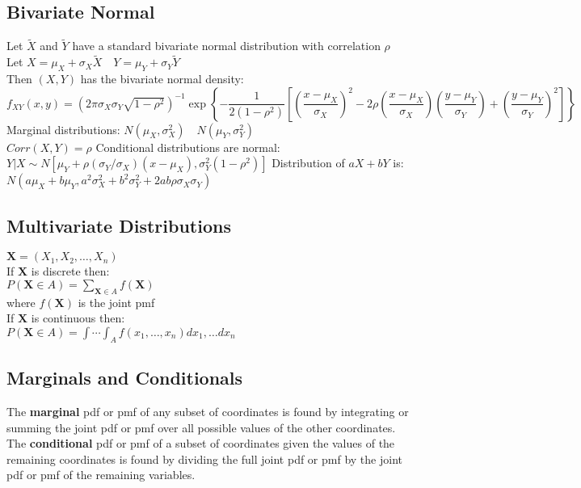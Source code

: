 \documentclass{article}
\begin{document}
\begin{flushleft}
\subsection*{Bivariate Normal}
Let $\tilde{X}$ and $\tilde{Y}$ have a standard bivariate normal distribution with correlation $\rho$\\
Let $X=\mu_X+\sigma_X\tilde{X} \quad Y=\mu_Y+\sigma_Y\tilde{Y}$\\
Then $(X,Y)$ has the bivariate normal density:\\
$f_{XY}(x,y)=\left(2\pi \sigma_X \sigma_Y \sqrt{1-\rho^2} \right)^{-1}\exp{\left\{-\dfrac{1}{2(1-\rho^2)}\left[\left(\dfrac{x-\mu_X}{\sigma_X} \right)^2- 2\rho \left(\dfrac{x-\mu_X}{\sigma_X} \right)\left(\dfrac{y-\mu_Y}{\sigma_Y} \right)+\left(\dfrac{y-\mu_Y}{\sigma_Y} \right)^2 \right] \right\}}$\medbreak
Marginal distributions: $N(\mu_X,\sigma^2_X) \quad N(\mu_Y,\sigma^2_Y)$\\
$Corr(X,Y)=\rho$\medbreak
Conditional distributions are normal:\\
$Y|X \sim N[\mu_Y+\rho(\sigma_Y/\sigma_X)(x-\mu_X),\sigma^2_Y(1-\rho^2)]$\medbreak
Distribution of $aX+bY$ is:\\
$N(a\mu_X+b\mu_Y,a^2\sigma^2_X+b^2\sigma^2_Y+2ab\rho \sigma_X \sigma_Y)$
\subsection*{Multivariate Distributions}
$\boldsymbol{X}=(X_1,X_2,\dots, X_n)$\\
If $\boldsymbol{X}$ is discrete then:\\
$P(\boldsymbol{X} \in A)=\sum_{\boldsymbol{X} \in A} f(\boldsymbol{X})$\\
where $f(\boldsymbol{X})$ is the joint pmf\\
If $\boldsymbol{X}$ is continuous then:\\
$P(\boldsymbol{X}\in A)=\int \cdots \int_{A}f(x_1,\dots,x_n)dx_1,\dots dx_n$\medbreak
\subsection*{Marginals and Conditionals}
The \textbf{marginal} pdf or pmf of any subset of coordinates is found by integrating or summing the joint pdf or pmf over all possible values of the other coordinates.\medbreak
The \textbf{conditional} pdf or pmf of a subset of coordinates given the values of the remaining coordinates is found by dividing the full joint pdf or pmf by the joint pdf or pmf of the remaining variables.

\end{flushleft}
\end{document}
